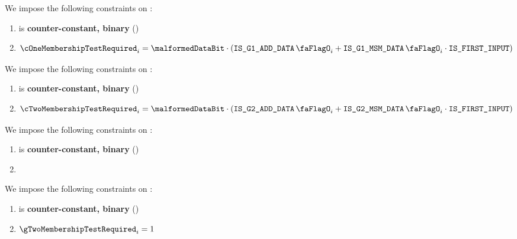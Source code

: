 We impose the following constraints on \cOneMembershipTestRequired{}:
\begin{enumerate}
    \item \cOneMembershipTestRequired{} is \textbf{counter-constant, binary} \quad (\trash)
    \item %
        \[
            \cOneMembershipTestRequired_{i} = \malformedDataBit \cdot (\isBlsGOneAddData_{i} + \isBlsGOneMsmData_{i} \cdot \isFirstInput)
        \]
\end{enumerate}
\noindent
We impose the following constraints on \cTwoMembershipTestRequired{}:
\begin{enumerate}
    \item \cTwoMembershipTestRequired{} is \textbf{counter-constant, binary} \quad (\trash)
    \item 
    \[
        \cTwoMembershipTestRequired_{i} = \malformedDataBit \cdot (\isBlsGTwoAddData_{i} + \isBlsGTwoMsmData_{i} \cdot \isFirstInput)
    \]
\end{enumerate}
\noindent
We impose the following constraints on \gOneMembershipTestRequired{}:
\begin{enumerate}
    \item \gOneMembershipTestRequired{} is \textbf{counter-constant, binary} \quad (\trash)
    \item 

\end{enumerate}
\noindent
We impose the following constraints on \gTwoMembershipTestRequired{}:
\begin{enumerate}
    \item \gTwoMembershipTestRequired{} is \textbf{counter-constant, binary} \quad (\trash)
    \item \If $\gTwoMembershipTestRequired_{i} = 1$ \Then
\end{enumerate}

